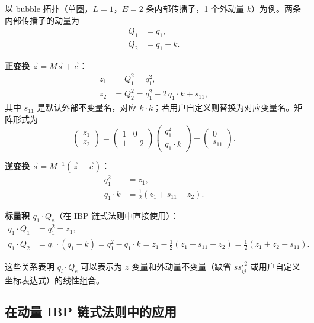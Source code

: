 ﻿\documentclass[a4paper,11pt]{article}
\begin{document}
以 bubble 拓扑（单圈，$L=1$，$E=2$ 条内部传播子，1 个外动量 $k$）为例。两条内部传播子的动量为
\begin{align}
  Q_1 &= q_1, \\
  Q_2 &= q_1 - k.
\end{align}

\textbf{正变换} $\vec{z} = M \vec{s} + \vec{c}$：
\begin{align}
  z_1 &= Q_1^2 = q_1^2, \label{z1bubble} \\
  z_2 &= Q_2^2 = q_1^2 - 2\, q_1 \cdot k + s_{11}, \label{z2bubble}
\end{align}
其中 $s_{11}$ 是默认外部不变量名，对应 $k \cdot k$；若用户自定义则替换为对应变量名。矩阵形式为
\begin{equation}
  \begin{pmatrix} z_1 \\ z_2 \end{pmatrix}
  = \begin{pmatrix} 1 & 0 \\ 1 & -2 \end{pmatrix}
  \begin{pmatrix} q_1^2 \\ q_1 \cdot k \end{pmatrix}
  + \begin{pmatrix} 0 \\ s_{11} \end{pmatrix}.
  \label{bubbleMatrix}
\end{equation}

\textbf{逆变换} $\vec{s} = M^{-1}(\vec{z} - \vec{c})$：
\begin{align}
  q_1^2 &= z_1, \label{q1sqInv} \\
  q_1 \cdot k &= \frac{1}{2}(z_1 + s_{11} - z_2). \label{q1kInv}
\end{align}

\textbf{标量积 $q_1 \cdot Q_e$}（在 IBP 链式法则中直接使用）：
\begin{align}
  q_1 \cdot Q_1 &= q_1^2 = z_1, \label{q1Q1} \\
  q_1 \cdot Q_2 &= q_1 \cdot (q_1 - k) = q_1^2 - q_1 \cdot k = z_1 - \frac{1}{2}(z_1 + s_{11} - z_2) = \frac{1}{2}(z_1 + z_2 - s_{11}). \label{q1Q2}
\end{align}

这些关系表明 $q_l \cdot Q_e$ 可以表示为 $z$ 变量和外动量不变量（缺省 $ss_{ij}^{,2}$ 或用户自定义坐标表达式）的线性组合。

\subsection{在动量 IBP 链式法则中的应用}
\end{document}
